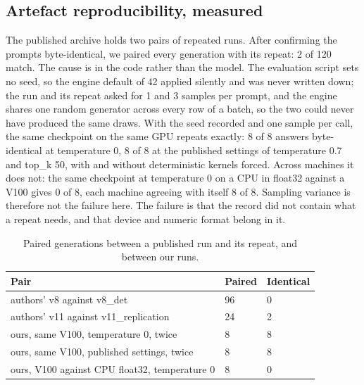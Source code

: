 

\subsection{Artefact reproducibility, measured}

The published archive holds two pairs of repeated runs. After confirming the prompts byte-identical, we paired every generation with its repeat: 2 of 120 match. The cause is in the code rather than the model. The evaluation script sets no seed, so the engine default of 42 applied silently and was never written down; the run and its repeat asked for 1 and 3 samples per prompt, and the engine shares one random generator across every row of a batch, so the two could never have produced the same draws. With the seed recorded and one sample per call, the same checkpoint on the same GPU repeats exactly: 8 of 8 answers byte-identical at temperature 0, 8 of 8 at the published settings of temperature 0.7 and top\_k 50, with and without deterministic kernels forced. Across machines it does not: the same checkpoint at temperature 0 on a CPU in float32 against a V100 gives 0 of 8, each machine agreeing with itself 8 of 8. Sampling variance is therefore not the failure here. The failure is that the record did not contain what a repeat needs, and that device and numeric format belong in it.

\begin{table}[t]
\caption{Paired generations between a published run and its repeat, and between our runs.}
\begin{ruledtabular}
\begin{tabular}{lll}
Pair & Paired & Identical \\
\hline
authors' v8 against v8\_det & 96 & 0 \\
authors' v11 against v11\_replication & 24 & 2 \\
ours, same V100, temperature 0, twice & 8 & 8 \\
ours, same V100, published settings, twice & 8 & 8 \\
ours, V100 against CPU float32, temperature 0 & 8 & 0 \\
\end{tabular}
\end{ruledtabular}
\end{table}


